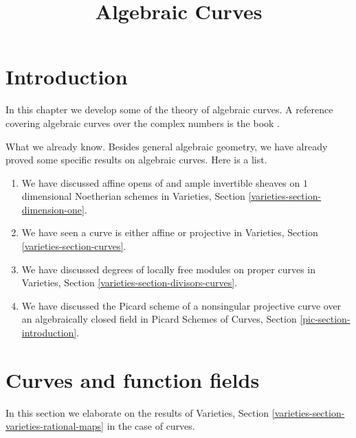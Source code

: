 

%


\title{Algebraic Curves}


\maketitle

\label{section-phantom}

\tableofcontents

\section{Introduction}
\label{section-introduction}

\noindent
In this chapter we develop some of the theory of algebraic curves.
A reference covering algebraic curves over the complex numbers is
the book \cite{ACGH}.

\medskip\noindent
What we already know. Besides general algebraic geometry, we
have already proved some specific results on algebraic curves.
Here is a list.
\begin{enumerate}
\item We have discussed affine opens of and ample invertible sheaves on
$1$ dimensional Noetherian schemes in
Varieties, Section \ref{varieties-section-dimension-one}.
\item We have seen a curve is either affine or projective
in Varieties, Section \ref{varieties-section-curves}.
\item We have discussed degrees of locally free modules on
proper curves in Varieties, Section \ref{varieties-section-divisors-curves}.
\item We have discussed the Picard scheme of a nonsingular projective
curve over an algebraically closed field in
Picard Schemes of Curves, Section \ref{pic-section-introduction}.
\end{enumerate}





\section{Curves and function fields}
\label{section-curves-function-fields}

\noindent
In this section we elaborate on the results of
Varieties, Section \ref{varieties-section-varieties-rational-maps}
in the case of curves.

